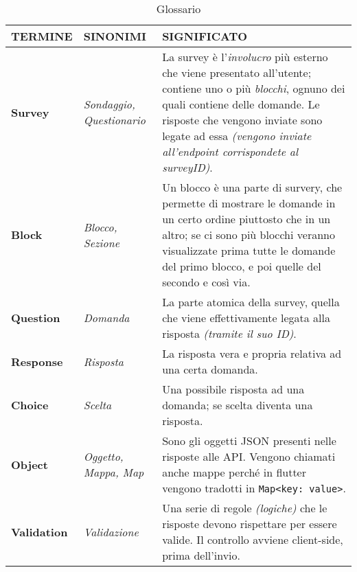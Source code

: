 \begin{table}[h!]
\centering
\def\arraystretch{1.5}
\label{table:glossario}
\begin{tabular}{| m{6em} | m{6em} | m{21em} |}
 \hline
 \textbf{TERMINE} & \textbf{SINONIMI} & \textbf{SIGNIFICATO} \\
 \hline \hline
 
 \textbf{Survey} & \textit{Sondaggio, Questionario} & La survey è l'\textit{involucro} più esterno che viene presentato all'utente; contiene uno o più \textit{blocchi}, ognuno dei quali contiene delle domande. Le risposte che vengono inviate sono legate ad essa \textit{(vengono inviate all'endpoint corrispondete al surveyID)}. \\ 
 \hline
 
 \textbf{Block} & \textit{Blocco, \newline Sezione} & Un blocco è una parte di survery, che permette di mostrare le domande in un certo ordine piuttosto che in un altro; se ci sono più blocchi veranno visualizzate prima tutte le domande del primo blocco, e poi quelle del secondo e così via. \\ 
 \hline
 
 \textbf{Question} & \textit{Domanda} & La parte atomica della survey, quella che viene effettivamente legata alla risposta \textit{(tramite il suo ID)}. \\
 \hline
 
 \textbf{Response} & \textit{Risposta} & La risposta vera e propria relativa ad una certa domanda. \\
 \hline
 
 \textbf{Choice} & \textit{Scelta} & Una possibile risposta ad una domanda; se scelta diventa una risposta. \\
 \hline
 
 \textbf{Object} & \textit{Oggetto, Mappa, Map} & Sono gli oggetti JSON presenti nelle risposte alle API. \newline Vengono chiamati anche mappe perché in flutter vengono tradotti in \texttt{Map<key: value>}. \\
 \hline
 
 \textbf{Validation} & \textit{Validazione} & Una serie di regole \textit{(logiche)} che le risposte devono rispettare per essere valide. Il controllo avviene client-side, prima dell'invio. \\
 \hline
\end{tabular}
\caption{Glossario}
\end{table}
